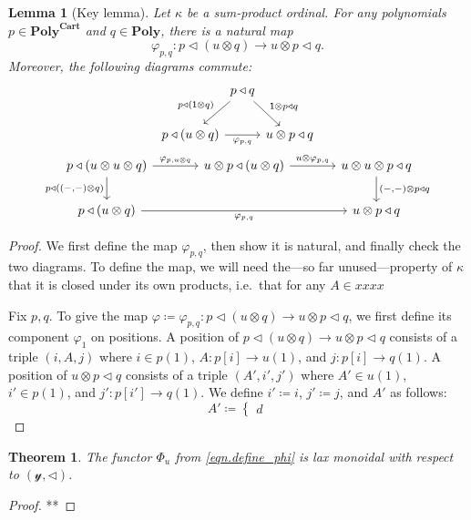 \documentclass[11pt, one side, article]{memoir}
\theoremstyle{definition}
\theoremstyle{plain}
\newtheorem{theorem}[definitionx]{Theorem}
\newtheorem{lemma}[definitionx]{Lemma}
\newcommand{\Cat}[1]{\mathbf{#1}}%
\newcommand{\yon}{\mathcal{y}}
\newcommand{\poly}{\Cat{Poly}}
\newcommand{\polycart}{\poly^{\Cat{Cart}}}
\newcommand{\0}{\textsf{0}}
\newcommand{\1}{\tn{\textsf{1}}}
\newcommand{\tri}{\mathbin{\triangleleft}}
\begin{document}
\begin{lemma}[Key lemma]\label{lemma.key}
Let $\kappa$ be a sum-product ordinal. For any polynomials $p\in\polycart$ and $q\in\poly$, there is a natural map 
\[\varphi_{p,q}\colon p\tri(u\otimes q)\to u\otimes p\tri q.\] 
Moreover, the following diagrams commute:
\begin{gather*}
\begin{tikzcd}[column sep=0, ampersand replacement=\&]
	\&p\tri q\ar[dl, "p\tri(\1\otimes q)"']\ar[dr,"\1\otimes p\tri q"]\\
	p\tri(u\otimes q)\ar[rr, "\varphi_{p,q}"']\&\&u\otimes p\tri q
\end{tikzcd}
\\
\begin{tikzcd}[, ampersand replacement=\&, column sep=large]
	p\tri(u\otimes u\otimes q)\ar[r, "\varphi_{p,u\otimes q}"]\ar[d, "p\tri{((-,-)\otimes q)}"']\&
	u\otimes p\tri(u\otimes q)\ar[r, "u\otimes\varphi_{p,q}"]\&
	u\otimes u\otimes p\tri q\ar[d, "{(-,-)}\otimes p\tri q"]\\
	p\tri (u\otimes q)\ar[rr, "\varphi_{p,q}"']\&\&
	u\otimes p\tri q
\end{tikzcd}
\end{gather*}
\end{lemma}
\begin{proof}
We first define the map $\varphi_{p,q}$, then show it is natural, and finally check the two diagrams. To define the map, we will need the---so far unused---property of $\kappa$ that it is closed under its own products, i.e.\ that for any $A\in xxxx$

Fix $p,q$. To give the map $\varphi\coloneqq\varphi_{p,q}\colon p\tri(u\otimes q)\to u\otimes p\tri q$, we first define its component $\varphi_1$ on positions. A position of $p\tri(u\otimes q)\to u\otimes p\tri q$ consists of a triple $(i,A,j)$ where $i\in p(1)$, $A\colon p[i]\to u(1)$, and $j\colon p[i]\to q(1)$. A position of $u\otimes p\tri q$ consists of a triple $(A',i',j')$ where $A'\in u(1)$, $i'\in p(1)$, and $j'\colon p[i']\to q(1)$. We define $i'\coloneqq i$, $j'\coloneqq j$, and $A'$ as follows:
\[
  A'\coloneqq
  \begin{cases}
  	d
  \end{cases}
\]
\end{proof}

\begin{theorem}
The functor $\Phi_u$ from \eqref{eqn.define_phi} is lax monoidal with respect to $(\yon,\tri)$.
\end{theorem}
\begin{proof}
**
\end{proof}

\printbibliography
\end{document}
